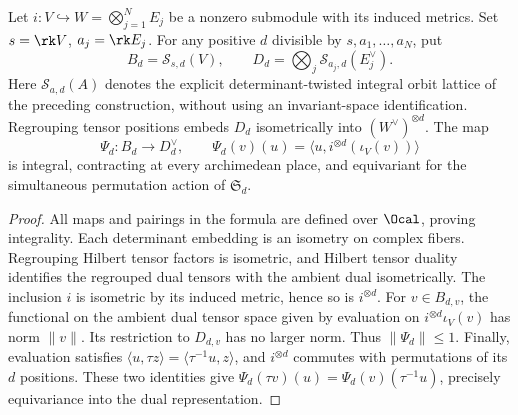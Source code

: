 \begin{lemma}
\label{lem:canonical-contraction}
\leanok
{}
Let $i:V\hookrightarrow W=\bigotimes_{j=1}^N E_j$ be a nonzero
submodule with its induced metrics. Set $s=\rk V$, $a_j=\rk E_j$.
For any positive $d$ divisible by $s,a_1,\ldots,a_N$, put
\[
 B_d=\mathcal S_{s,d}(V),\qquad
 D_d=\bigotimes_j\mathcal S_{a_j,d}(E_j^\vee).
\]
Here $\mathcal S_{a,d}(A)$ denotes the explicit determinant-twisted
integral orbit lattice of the preceding construction, without using
an invariant-space identification. Regrouping tensor positions embeds $D_d$ isometrically into
$(W^\vee)^{\otimes d}$. The map
\[
 \Psi_d:B_d\to D_d^\vee,\qquad
 \Psi_d(v)(u)=\langle u,i^{\otimes d}(\iota_V(v))\rangle
\]
is integral, contracting at every archimedean place, and equivariant
for the simultaneous permutation action of $\mathfrak S_d$.
\end{lemma}
\begin{proof}
All maps and pairings in the formula are defined over $\Ocal$, proving
integrality. Each determinant embedding is an isometry on complex fibers.
Regrouping Hilbert tensor factors is isometric, and Hilbert tensor
duality identifies the regrouped dual tensors with the ambient dual
isometrically. The inclusion $i$ is
isometric by its induced metric, hence so is $i^{\otimes d}$. For
$v\in B_{d,v}$, the functional on the ambient dual tensor space given
by evaluation on $i^{\otimes d}\iota_V(v)$ has norm $\|v\|$.
Its restriction to $D_{d,v}$ has no larger norm. Thus $\|\Psi_d\|\leq1$.
Finally, evaluation satisfies
$\langle u,\tau z\rangle=\langle\tau^{-1}u,z\rangle$, and
$i^{\otimes d}$ commutes with permutations of its $d$ positions.
These two identities give
$\Psi_d(\tau v)(u)=\Psi_d(v)(\tau^{-1}u)$, precisely equivariance
into the dual representation.
\end{proof}

